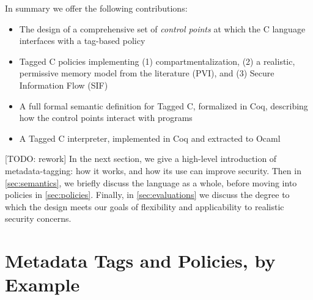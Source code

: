 \documentclass{llncs}
\begin{document}
In summary we offer the following contributions:

\begin{itemize}
\item The design of a comprehensive set of {\em control points} at which the C language interfaces with a tag-based policy
\item Tagged C policies implementing (1) compartmentalization,
  (2) a realistic, permissive memory model from the literature (PVI),
  and (3) Secure Information Flow (SIF)
\item A full formal semantic definition for Tagged C, formalized in Coq, describing how the control points
  interact with programs
\item A Tagged C interpreter, implemented in Coq and extracted to Ocaml
\end{itemize}

[TODO: rework]
In the next section, we give a high-level introduction of metadata-tagging: how it works,
and how its use can improve security. Then in \cref{sec:semantics}, we briefly discuss the
language as a whole, before moving into policies in \cref{sec:policies}. Finally, in
\cref{sec:evaluations} we discuss the degree to
which the design meets our goals of flexibility and applicability to realistic
security concerns.

\section{Metadata Tags and Policies, by Example}
\end{document}
